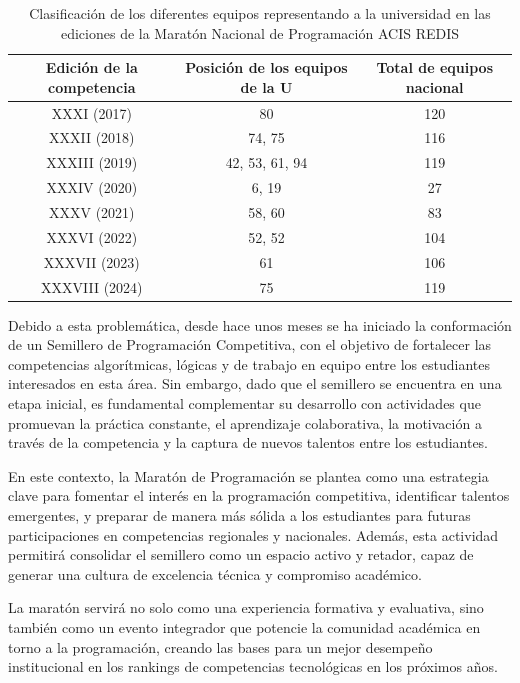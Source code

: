 \documentclass{article}
\begin{document}
\begin{table}[h]
  \centering
  \begin{tabular}{|c|c|c|}
    \hline
    Edición de la competencia& Posición de los equipos de la U& Total de equipos nacional \\ \hline
    XXXI (2017) & 80 & 120 \\ \hline
    XXXII (2018) & 74, 75 & 116 \\ \hline
    XXXIII (2019) & 42, 53, 61, 94 & 119 \\ \hline
    XXXIV (2020) & 6, 19 & 27 \\ \hline
    XXXV (2021) & 58, 60 & 83 \\ \hline
    XXXVI (2022) & 52, 52 & 104 \\ \hline
    XXXVII (2023) & 61 & 106 \\ \hline
    XXXVIII (2024) & 75 & 119 \\ \hline
  \end{tabular}
  \caption{Clasificación de los diferentes equipos representando a la universidad en las ediciones de la Maratón Nacional de Programación ACIS REDIS\cite{icpc2024,icpc2023,icpc2022,icpc2021,icpc2020,icpc2019,icpc2018}}
  \label{tab:resultados-competencias}
\end{table}


Debido a esta problemática, desde hace unos meses se ha iniciado la conformación de un Semillero de Programación Competitiva\cite{pcutadeo_github}, con el objetivo de fortalecer las competencias algorítmicas, lógicas y de trabajo en equipo entre los estudiantes interesados en esta área. Sin embargo, dado que el semillero se encuentra en una etapa inicial, es fundamental complementar su desarrollo con actividades que promuevan la práctica constante, el aprendizaje colaborativa, la motivación a través de la competencia y la captura de nuevos talentos entre los estudiantes.

En este contexto, la Maratón de Programación se plantea como una estrategia clave para fomentar el interés en la programación competitiva, identificar talentos emergentes, y preparar de manera más sólida a los estudiantes para futuras participaciones en competencias regionales y nacionales. Además, esta actividad permitirá consolidar el semillero como un espacio activo y retador, capaz de generar una cultura de excelencia técnica y compromiso académico.

La maratón servirá no solo como una experiencia formativa y evaluativa, sino también como un evento integrador que potencie la comunidad académica en torno a la programación, creando las bases para un mejor desempeño institucional en los rankings de competencias tecnológicas en los próximos años.
\end{document}

